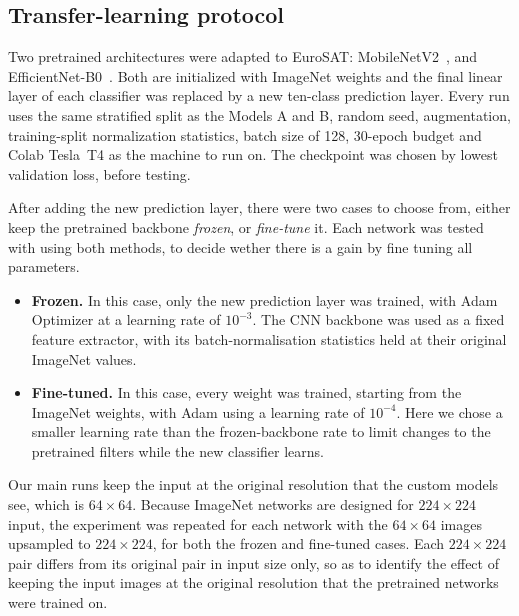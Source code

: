
\subsection{Transfer-learning protocol}
\label{sec:sota-protocol}

Two pretrained architectures were adapted to EuroSAT:
MobileNetV2~\cite{sandler2018mobilenetv2}, and EfficientNet-B0~\cite{tan2019efficientnet}.
Both are initialized with ImageNet weights and the final linear layer of each classifier was replaced by a
new ten-class prediction layer. Every run uses the same stratified split as the Models A and B, 
random seed, augmentation, training-split normalization statistics, batch
size of 128, 30-epoch budget and Colab Tesla~T4 as the machine to run on. 
The checkpoint was chosen by lowest validation loss, before testing.

After adding the new prediction layer, there were two cases to choose from, either
keep the pretrained backbone \emph{frozen}, or \emph{fine-tune} it. Each
network was tested with using both methods, to decide wether there is a gain by fine tuning all parameters.

\begin{itemize}[leftmargin=*]
  \item \textbf{Frozen.} In this case, only the new prediction layer was trained, with Adam Optimizer at
  a learning rate of $10^{-3}$. The CNN backbone was used as a fixed feature extractor,
  with its batch-normalisation statistics held at their original ImageNet values.
  \item \textbf{Fine-tuned.} In this case, every weight was trained, starting from the
  ImageNet weights, with Adam using a learning rate of $10^{-4}$. Here we chose a smaller learning rate
 than the frozen-backbone rate to limit changes to the pretrained filters while
  the new classifier learns.
\end{itemize}

Our main runs keep the input at  the original resolution that the custom
models see, which is $64\times64$. Because ImageNet networks are
designed for $224\times224$ input, the experiment was repeated for each network
with the $64\times64$ images upsampled to $224\times224$, for both the frozen and fine-tuned cases. Each $224\times224$
pair differs from its original pair in input size only, so as to identify the effect of keeping the input images at the original resolution that the pretrained networks were trained on.

